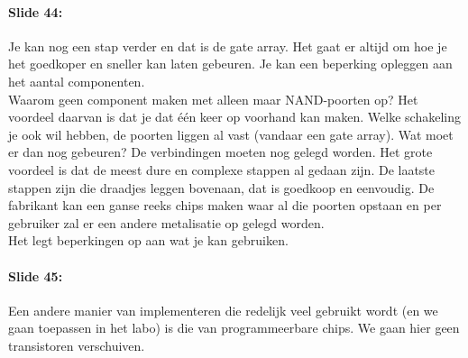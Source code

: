 \documentclass[10pt,a4paper]{book}
\begin{document}
\paragraph{Slide 44:} Je kan nog een stap verder en dat is de gate array. Het gaat er altijd om hoe je het goedkoper en sneller kan laten gebeuren. Je kan een beperking opleggen aan het aantal componenten.\\
Waarom geen component maken met alleen maar NAND-poorten op? Het voordeel daarvan is dat je dat \'e\'en keer op voorhand kan maken. Welke schakeling je ook wil hebben, de poorten liggen al vast (vandaar een gate array). Wat moet er dan nog gebeuren? De verbindingen moeten nog gelegd worden. Het grote voordeel is dat de meest dure en complexe stappen al gedaan zijn. De laatste stappen zijn die draadjes leggen bovenaan, dat is goedkoop en eenvoudig. De fabrikant kan een ganse reeks chips maken waar al die poorten opstaan en per gebruiker zal er een andere metalisatie op gelegd worden.\\
Het legt beperkingen op aan wat je kan gebruiken.

\paragraph{Slide 45:} Een andere manier van implementeren die redelijk veel gebruikt wordt (en we gaan toepassen in het labo) is die van programmeerbare chips. We gaan hier geen transistoren verschuiven. 
\end{document}
